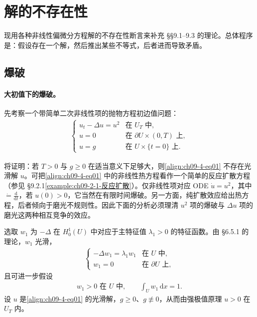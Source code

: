 \documentclass[../../main.tex]{subfiles}
\begin{document}
\section{解的不存在性}\label{section:ch09-4-解的不存在性}

现用各种非线性偏微分方程解的不存在性断言来补充 \S\S9.1--9.3 的理论。总体程序是：假设存在一个解，然后推出某些不等式，后者进而导致矛盾。

\subsection{爆破}\label{subsection:ch09-4-1-爆破}

\paragraph{大初值下的爆破。}先考察一个带简单二次非线性项的抛物方程初边值问题：
\begin{align}
\begin{cases}
u_t-\Delta u=u^2&\text{在 }U_T\text{ 中},\\
u=0&\text{在 }\partial U\times(0,T)\text{ 上},\\
u=g&\text{在 }U\times\{t=0\}\text{ 上}.
\end{cases}\label{align:ch09-4-eq01}
\end{align}

将证明：若 $T>0$ 与 $g\geqslant 0$ 在适当意义下足够大，则\eqref{align:ch09-4-eq01} 不存在光滑解 $u$。可把\eqref{align:ch09-4-eq01} 中的非线性热方程看作一个简单的反应扩散方程（参见 \S9.2.1\cref{example:ch09-2-1-反应扩散}）。仅非线性项对应 ODE $\dot u=u^2$，其中 $\dot=\frac{\mathrm{d}}{\mathrm{d}t}$，若 $u(0)>0$，它当然在有限时间爆破。另一方面，纯扩散效应给出热方程，后者倾向于磨光不规则性。因此下面的分析必须理清 $u^2$ 项的爆破与 $\Delta u$ 项的磨光这两种相互竞争的效应。

选取 $w_1$ 为 $-\Delta$ 在 $H_0^1(U)$ 中对应于主特征值 $\lambda_1>0$ 的特征函数。由 \S6.5.1 的理论，$w_1$ 光滑，
\begin{align*}
\begin{cases}
-\Delta w_1=\lambda_1w_1&\text{在 }U\text{ 中},\\
w_1=0&\text{在 }\partial U\text{ 上},
\end{cases}
\end{align*}
且可进一步假设
\begin{align}
w_1>0\text{ 在 }U\text{ 中},\qquad \int_U w_1\,\mathrm{d}x=1.\label{align:ch09-4-eq02}
\end{align}
设 $u$ 是\eqref{align:ch09-4-eq01} 的光滑解，$g\geqslant 0$、$g\not\equiv 0$，从而由强极值原理 $u>0$ 在 $U_T$ 内。
\end{document}

